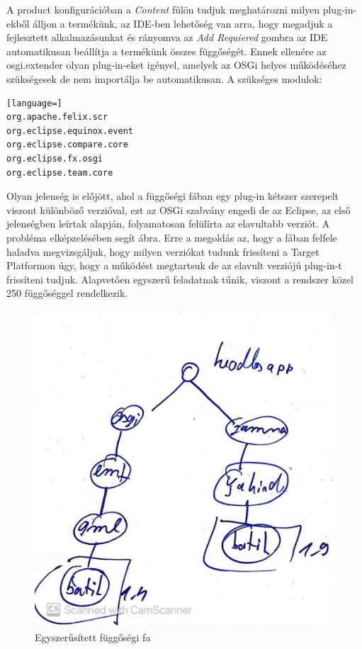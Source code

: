 A product konfigurációban a \textit{Content} fülön tudjuk meghatározni milyen plug-in-ekből álljon a termékünk, az IDE-ben lehetőség van arra, hogy megadjuk a fejlesztett alkalmazásunkat és rányomva az \textit{Add Requiered} gombra az IDE automatikusan beállítja a termékünk összes függőségét. Ennek ellenére az osgi.extender olyan plug-in-eket igényel, amelyek az OSGi helyes működéséhez szükségesek de nem importálja be automatikusan. A szükséges modulok:
\begin{lstlisting}[language=]
org.apache.felix.scr
org.eclipse.equinox.event
org.eclipse.compare.core
org.eclipse.fx.osgi
org.eclipse.team.core
\end{lstlisting}

Olyan jelenség is előjött, ahol a függőségi fában egy plug-in kétszer szerepelt viszont különböző verzióval, ezt az OSGi szabvány engedi de az Eclipse, az első jelenségben leírtak alapján, folyamatosan felülírta az elavultabb verziót. A probléma elképzelésében segít   ábra. Erre a megoldás az, hogy a fában felfele haladva megvizsgáljuk, hogy milyen verziókat tudunk frissíteni a Target Platformon úgy, hogy a működést megtartsuk de az elavult verziójú plug-in-t frissíteni tudjuk. Alapvetően egyszerű feladatnak tűnik, viszont a rendszer közel 250 függőséggel rendelkezik.

\begin{figure}[t]
	\includegraphics[width=150mm, keepaspectratio]{figures/depend.jpg}
	\caption{Egyszerűsített függőségi fa}
	\label{fig:depend}
\end{figure}

